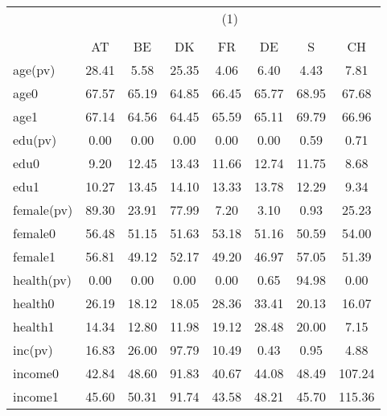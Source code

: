 {
\def\sym#1{\ifmmode^{#1}\else\(^{#1}\)\fi}
\begin{tabular}{l*{1}{ccccccc}}
\hline\hline
          &\multicolumn{7}{c}{(1)}                                              \\
          &\multicolumn{7}{c}{}                                                 \\
          &       AT&       BE&       DK&       FR&       DE&        S&       CH\\
\hline
age(pv)   &    28.41&     5.58&    25.35&     4.06&     6.40&     4.43&     7.81\\
age0      &    67.57&    65.19&    64.85&    66.45&    65.77&    68.95&    67.68\\
age1      &    67.14&    64.56&    64.45&    65.59&    65.11&    69.79&    66.96\\
edu(pv)   &     0.00&     0.00&     0.00&     0.00&     0.00&     0.59&     0.71\\
edu0      &     9.20&    12.45&    13.43&    11.66&    12.74&    11.75&     8.68\\
edu1      &    10.27&    13.45&    14.10&    13.33&    13.78&    12.29&     9.34\\
female(pv)&    89.30&    23.91&    77.99&     7.20&     3.10&     0.93&    25.23\\
female0   &    56.48&    51.15&    51.63&    53.18&    51.16&    50.59&    54.00\\
female1   &    56.81&    49.12&    52.17&    49.20&    46.97&    57.05&    51.39\\
health(pv)&     0.00&     0.00&     0.00&     0.00&     0.65&    94.98&     0.00\\
health0   &    26.19&    18.12&    18.05&    28.36&    33.41&    20.13&    16.07\\
health1   &    14.34&    12.80&    11.98&    19.12&    28.48&    20.00&     7.15\\
inc(pv)   &    16.83&    26.00&    97.79&    10.49&     0.43&     0.95&     4.88\\
income0   &    42.84&    48.60&    91.83&    40.67&    44.08&    48.49&   107.24\\
income1   &    45.60&    50.31&    91.74&    43.58&    48.21&    45.70&   115.36\\
\hline\hline
\end{tabular}
}

